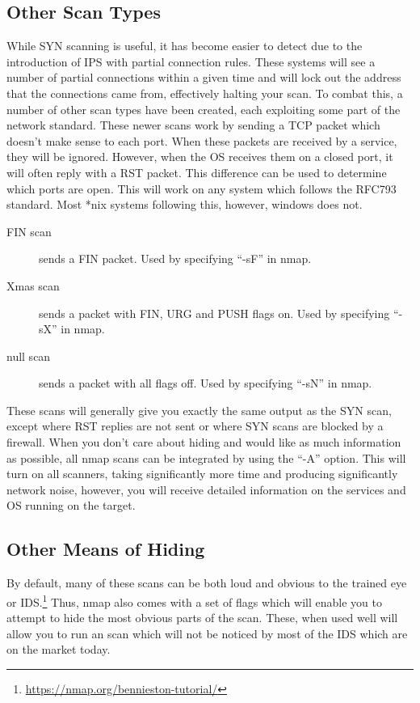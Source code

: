 		\subsection{Other Scan Types}
			While SYN scanning is useful, it has become easier to detect due to the introduction of IPS with partial connection rules.
			These systems will see a number of partial connections within a given time and will lock out the address that the connections came from, effectively halting your scan.
			To combat this, a number of other scan types have been created, each exploiting some part of the network standard.
			These newer scans work by sending a TCP packet which doesn't make sense to each port.
			When these packets are received by a service, they will be ignored.
			However, when the OS receives them on a closed port, it will often reply with a RST packet.
			This difference can be used to determine which ports are open.
			This will work on any system which follows the RFC793 standard.
			Most *nix systems following this, however, windows does not.
			\begin{description}
				\item[FIN scan]
					sends a FIN packet.
					Used by specifying ``-sF'' in nmap.
				\item[Xmas scan]
					sends a packet with FIN, URG and PUSH flags on.
					Used by specifying ``-sX'' in nmap.
				\item[null scan]
					sends a packet with all flags off.
					Used by specifying ``-sN'' in nmap.
			\end{description}
			These scans will generally give you exactly the same output as the SYN scan, except where RST replies are not sent or where SYN scans are blocked by a firewall.
			When you don't care about hiding and would like as much information as possible, all nmap scans can be integrated by using the ``-A'' option.
			This will turn on all scanners, taking significantly more time and producing significantly network noise, however, you will receive detailed information on the services and OS running on the target.

		\subsection{Other Means of Hiding}
			By default, many of these scans can be both loud and obvious to the trained eye or IDS.\footnote{\url{https://nmap.org/bennieston-tutorial/}}
			Thus, nmap also comes with a set of flags which will enable you to attempt to hide the most obvious parts of the scan.
			These, when used well will allow you to run an scan which will not be noticed by most of the IDS which are on the market today.

